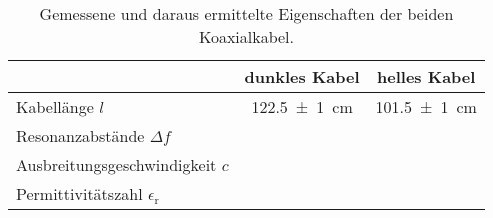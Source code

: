 	\begin{table}[H]
		\centering
		\caption{Gemessene und daraus ermittelte Eigenschaften der beiden Koaxialkabel.} 
		\label{tab:kabel}
		\begin{tabular}{l|c|c}
			&           dunkles Kabel           &           helles Kabel           \\ \hline 
			Kabellänge $l$                         &   \SI{122,5 +- 1}{\centi\meter}   &   \SI{101,5 +- 1}{\centi\meter}   \\
			Resonanzabstände $\Delta f$            &  &  \\
			Ausbreitungsgeschwindigkeit $c$        &         &         \\
			Permittivitätszahl $\epsilon_\text{r}$ &               &          \\ 
		\end{tabular}
	\end{table}
	